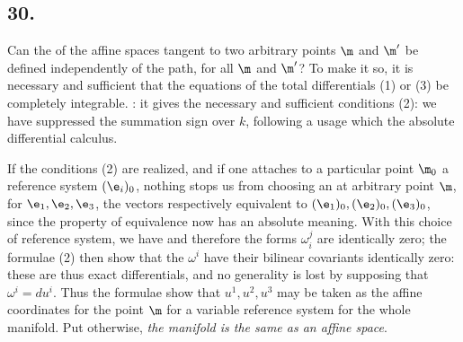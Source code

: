 \subsection*{30.}

Can the  of the affine spaces tangent to two arbitrary points $\m$ and $\m'$ be defined independently of the path, for all $\m$ and $\m'$? To make it so, it is necessary and sufficient that the equations of the total differentials (1) or (3) be completely integrable. : it gives the necessary and sufficient conditions (2):
we have suppressed the summation sign over $k$, following a usage which  the absolute differential calculus.

If the conditions (2) are realized, and if one attaches to a particular point $\m_0$ a reference system $(\e_i)_0$, nothing stops us from choosing an at arbitrary point $\m$, for $\e_1, \e_2, \e_3$, the vectors respectively equivalent to $(\e_1)_0, (\e_2)_0, (\e_3)_0$, since the property of equivalence now has an absolute meaning. With this choice of reference system, we have
and therefore the forms $\omega_i^j$ are identically zero; the formulae (2) then show that the $\omega^i$ have their bilinear covariants identically zero: these are thus exact differentials, and no generality is lost by supposing that $\omega^i = du^i$. Thus the formulae 
show that $u^1, u^2, u^3$ may be taken as the affine coordinates for the point $\m$ for a variable reference system for the whole manifold. Put otherwise, \textit{the manifold is the same as an affine space}.


%
